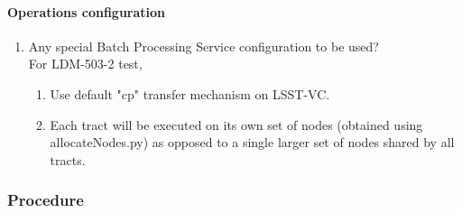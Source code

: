 \paragraph{Operations configuration}
\begin{enumerate}
    \item{Any special Batch Processing Service configuration to be used?} \\
    For LDM-503-2 test,
    \begin{enumerate}
        \item{Use default "cp" transfer mechanism on LSST-VC.}
        \item{Each tract will be executed on its own set of nodes (obtained using allocateNodes.py) as opposed to a single larger set of nodes shared by all tracts.}
    \end{enumerate}

\end{enumerate}




\subsubsection{Procedure}




